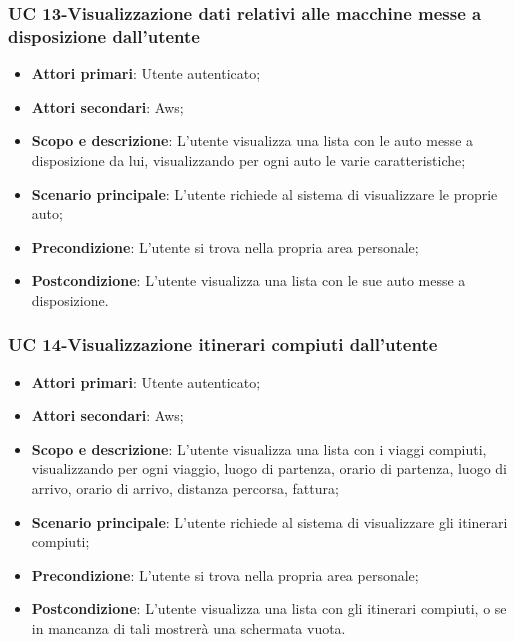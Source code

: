      
        
      \subsubsection{UC 13-Visualizzazione dati relativi alle macchine messe a disposizione dall'utente}
        \begin{itemize}
        \item \textbf{Attori primari}: Utente autenticato;
        \item \textbf{Attori secondari}: Aws;
        \item \textbf{Scopo e descrizione}: L'utente visualizza una lista con le auto messe a disposizione da lui, visualizzando per ogni auto le varie caratteristiche; 
        \item \textbf{Scenario principale}: L'utente richiede al sistema di visualizzare le proprie auto;
        \item \textbf{Precondizione}: L'utente si trova nella propria area personale;
        \item \textbf{Postcondizione}: L'utente visualizza una lista con le sue auto messe a disposizione.
        \end{itemize}
 
            
         \subsubsection{UC 14-Visualizzazione itinerari compiuti dall'utente}
        \begin{itemize}
        \item \textbf{Attori primari}: Utente autenticato;
        \item \textbf{Attori secondari}: Aws;
        \item \textbf{Scopo e descrizione}: L'utente visualizza una lista con i viaggi compiuti, visualizzando per ogni viaggio, luogo di partenza, orario di partenza, luogo di arrivo, orario di arrivo, distanza percorsa, fattura; 
        \item \textbf{Scenario principale}: L'utente richiede al sistema di visualizzare gli itinerari compiuti;
        \item \textbf{Precondizione}: L'utente si trova nella propria area personale;
        \item \textbf{Postcondizione}: L'utente visualizza una lista con gli itinerari compiuti, o se in mancanza di tali mostrerà una schermata vuota.
        \end{itemize}    
            
